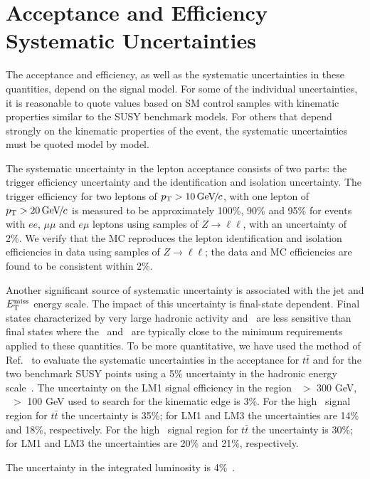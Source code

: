 \section{Acceptance and Efficiency Systematic Uncertainties}
\label{sec:systematics}

The acceptance and efficiency, as well as the systematic uncertainties in these quantities, 
depend on the signal model.
For some of the individual uncertainties, it is reasonable to quote values 
based on SM control samples with kinematic properties similar to the SUSY benchmark models. 
For others that depend strongly on the kinematic properties of the event, the systematic
uncertainties must be quoted model by model.

The systematic uncertainty in the lepton acceptance consists
of two parts: the trigger efficiency uncertainty and the 
identification and isolation uncertainty. The trigger efficiency 
for two leptons of $p_{\mathrm{T}}>10{\,\text{Ge\hspace{-.08em}V\hspace{-0.16em}/\hspace{-0.08em}}c}$, with one lepton of 
$p_{\mathrm{T}}>20{\,\text{Ge\hspace{-.08em}V\hspace{-0.16em}/\hspace{-0.08em}}c}$ is measured to be approximately 100\%, 90\% and 95\%
for events with $ee$, $\mu\mu$ and $e\mu$ leptons using samples of $Z \to \ell\ell$, 
with an uncertainty of 2\%. We verify that the MC reproduces the lepton identification and isolation efficiencies in data using
samples of $Z \to \ell\ell$; the data and MC efficiencies are found to be consistent within 2\%.

Another significant source of systematic uncertainty is 
associated with the jet and $E_{\mathrm{T}}^{\text{miss}}$ energy scale.  The impact
of this uncertainty is final-state dependent.  Final
states characterized by very large hadronic activity and \MET\ are 
less sensitive than final states where the \MET\ and \HT\ 
are typically close to the minimum requirements applied to these quantities.  To be more quantitative,
we have used the method of Ref.~\cite{ref:top} to evaluate
the systematic uncertainties in the acceptance for $t\bar{t}$ 
and for the two benchmark SUSY points using a 5\% uncertainty in the hadronic 
energy scale~\cite{ref:jes}.
The uncertainty on the LM1 signal efficiency in the region \Ht\ $>$ 300 GeV,
\MET\ $>$ 100 GeV used to search for the kinematic edge is 3\%.
For the high \MET\ signal region for $t\bar{t}$ the uncertainty is 35\%; for LM1 and LM3 the 
uncertainties are 14\% and 18\%, respectively.
For the high \Ht\ signal region for $t\bar{t}$ the uncertainty is 30\%; for LM1 and LM3 the 
uncertainties are 20\% and 21\%, respectively.

The uncertainty in the integrated luminosity is 4\%~\cite{ref:lumi}.
